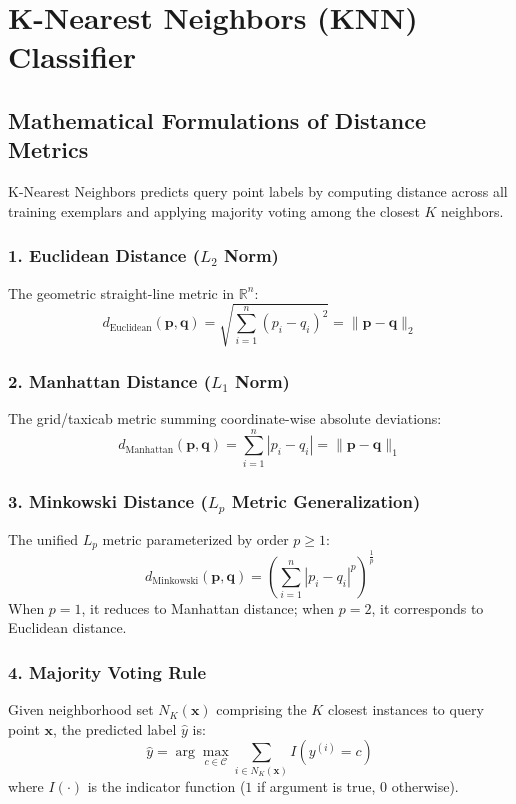 \documentclass[12pt]{article}
\begin{document}
\newpage
\section{K-Nearest Neighbors (KNN) Classifier}

\subsection{Mathematical Formulations of Distance Metrics}
K-Nearest Neighbors predicts query point labels by computing distance across all training exemplars and applying majority voting among the closest $K$ neighbors.

\subsubsection{1. Euclidean Distance ($L_2$ Norm)}
The geometric straight-line metric in $\mathbb{R}^n$:
\begin{equation}
    d_{\text{Euclidean}}(\mathbf{p}, \mathbf{q}) = \sqrt{\sum_{i=1}^{n} (p_i - q_i)^2} = \|\mathbf{p} - \mathbf{q}\|_2
\end{equation}

\subsubsection{2. Manhattan Distance ($L_1$ Norm)}
The grid/taxicab metric summing coordinate-wise absolute deviations:
\begin{equation}
    d_{\text{Manhattan}}(\mathbf{p}, \mathbf{q}) = \sum_{i=1}^{n} |p_i - q_i| = \|\mathbf{p} - \mathbf{q}\|_1
\end{equation}

\subsubsection{3. Minkowski Distance ($L_p$ Metric Generalization)}
The unified $L_p$ metric parameterized by order $p \ge 1$:
\begin{equation}
    d_{\text{Minkowski}}(\mathbf{p}, \mathbf{q}) = \left( \sum_{i=1}^{n} |p_i - q_i|^p \right)^{\frac{1}{p}}
\end{equation}
When $p=1$, it reduces to Manhattan distance; when $p=2$, it corresponds to Euclidean distance.

\subsubsection{4. Majority Voting Rule}
Given neighborhood set $N_K(\mathbf{x})$ comprising the $K$ closest instances to query point $\mathbf{x}$, the predicted label $\hat{y}$ is:
\begin{equation}
    \hat{y} = \arg\max_{c \in \mathcal{C}} \sum_{i \in N_K(\mathbf{x})} I(y^{(i)} = c)
\end{equation}
where $I(\cdot)$ is the indicator function ($1$ if argument is true, $0$ otherwise).
\end{document}
